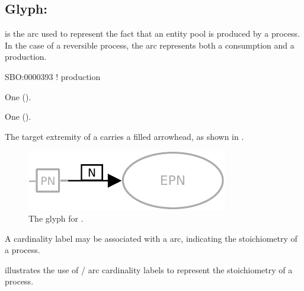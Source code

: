 \subsection{Glyph: }
\label{sec:production}

 is the arc used to represent the fact that an entity pool is produced by a process. In the case of a reversible process, the  arc represents both a consumption and a production.

\begin{glyphDescription}

\glyphSboTerm
SBO:0000393 ! production

\glyphOrigin
One  ().

\glyphTarget
One  ().

\glyphSymbol
The target extremity of a  carries a filled arrowhead, as shown in .

\end{glyphDescription}

\begin{figure}[H]
  \centering
  \includegraphics{images/build/production.pdf}
  \caption{The \PD glyph for .}
  \label{fig:production}
\end{figure}

A cardinality label may be associated with a  arc, indicating the stoichiometry of a process.

 illustrates the use of / arc cardinality labels to represent the stoichiometry of a process.


